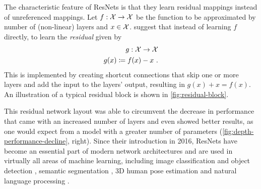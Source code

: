 The characteristic feature of ResNets is that they learn residual mappings instead of unreferenced mappings.
Let $f: \mathcal{X} \rightarrow \mathcal{X}$ be the function to be approximated by number of (non-linear) layers and $x \in \mathcal{X}$.
\citet{he16} suggest that instead of learning $f$ directly, to learn the \emph{residual} given by
\begin{equation}
	\begin{split}
		g: \mathcal{X} \rightarrow \mathcal{X} \\
		g(x) \coloneqq f(x) - x \ .
	\end{split}
\end{equation}
This is implemented by creating shortcut connections that skip one or more layers and add the input to the layers' output, resulting in $g(x) + x = f(x)$.
An illustration of a typical residual block is shown in \cref{fig:residual-block}.



This residual network layout was able to circumvent the decrease in performance that came with an increased number of layers and even showed better results, as one would expect from a model with a greater number of parameters (\cref{fig:depth-performance-decline}, right).
Since their introduction in 2016, ResNets have become an essential part of modern network architectures and are used in virtually all areas of machine learning, including image classification and object detection \cite{he16,carion20}, semantic segmentation \cite{chen17}, 3D human pose estimation \cite{drover18} and natural language processing \cite{keskar19,conneau16,vaswani17}.
